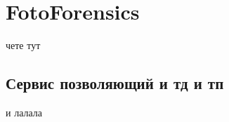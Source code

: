 \documentclass[12pt]{article}
\begin{document}
\section{FotoForensics}
чете тут
\subsection{Сервис позволяющий и тд и тп}
и лалала
\end{document}
